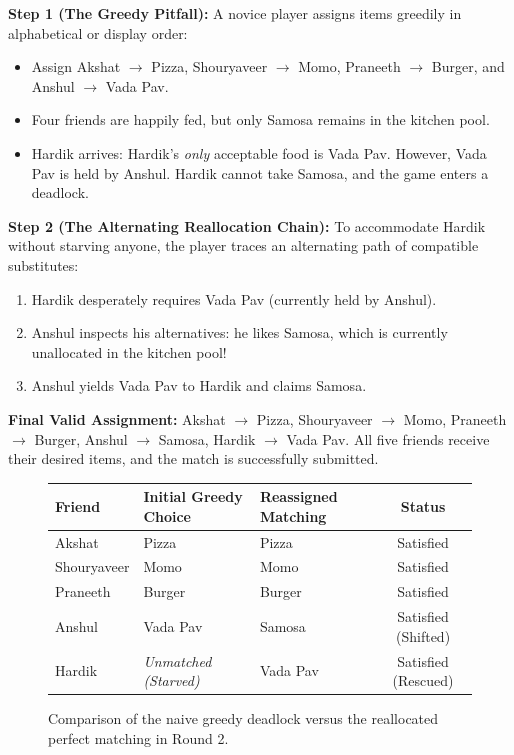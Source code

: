 \documentclass[11pt,a4paper]{article}
\begin{document}
\textbf{Step 1 (The Greedy Pitfall):} A novice player assigns items greedily in alphabetical or display order:
\begin{itemize}
  \item Assign Akshat $\to$ Pizza, Shouryaveer $\to$ Momo, Praneeth $\to$ Burger, and Anshul $\to$ Vada Pav.
  \item Four friends are happily fed, but only Samosa remains in the kitchen pool.
  \item Hardik arrives: Hardik's \emph{only} acceptable food is Vada Pav. However, Vada Pav is held by Anshul. Hardik cannot take Samosa, and the game enters a deadlock.
\end{itemize}

\textbf{Step 2 (The Alternating Reallocation Chain):} To accommodate Hardik without starving anyone, the player traces an alternating path of compatible substitutes:
\begin{enumerate}
  \item Hardik desperately requires Vada Pav (currently held by Anshul).
  \item Anshul inspects his alternatives: he likes Samosa, which is currently unallocated in the kitchen pool!
  \item Anshul yields Vada Pav to Hardik and claims Samosa.
\end{enumerate}

\textbf{Final Valid Assignment:} Akshat $\to$ Pizza, Shouryaveer $\to$ Momo, Praneeth $\to$ Burger, Anshul $\to$ Samosa, Hardik $\to$ Vada Pav. All five friends receive their desired items, and the match is successfully submitted.

\begin{figure}[htbp]
  \centering
  \small
  \begin{tabular}{|l|l|l|c|}
    \hline
    \textbf{Friend} & \textbf{Initial Greedy Choice} & \textbf{Reassigned Matching} & \textbf{Status} \\ \hline
    Akshat & Pizza & Pizza & Satisfied \\
    Shouryaveer & Momo & Momo & Satisfied \\
    Praneeth & Burger & Burger & Satisfied \\
    Anshul & Vada Pav & Samosa & Satisfied (Shifted) \\
    Hardik & \textit{Unmatched (Starved)} & Vada Pav & Satisfied (Rescued) \\ \hline
  \end{tabular}
  \caption{Comparison of the naive greedy deadlock versus the reallocated perfect matching in Round 2.}
  \label{tab:round2_matching}
\end{figure}
\end{document}
